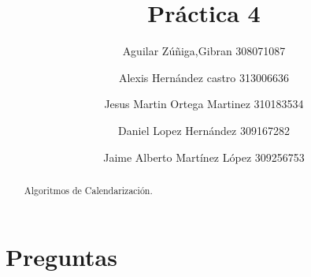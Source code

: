 \documentclass[a4paperx]{article}
\begin{document}
\title{Pr\'actica 4}
\author{
Aguilar Z\'u\~niga,Gibran 308071087 \and  Alexis Hernández castro 313006636 \and Jesus Martin Ortega Martinez 310183534 \and Daniel Lopez Hernández 309167282 \and Jaime Alberto Martínez López 309256753
}

\maketitle

\begin{abstract}
Algoritmos de Calendarizaci\'on.
\end{abstract}

\section{Preguntas}
\end{document}

